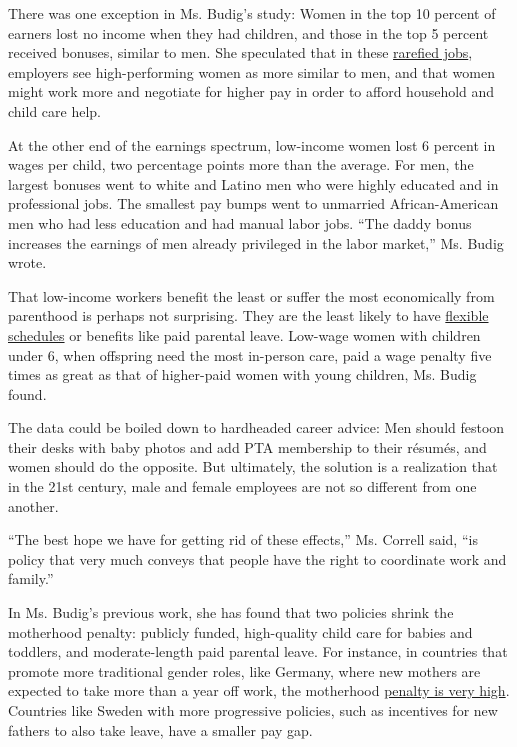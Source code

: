 There was one exception in Ms. Budig's study: Women in the top 10
percent of earners lost no income when they had children, and those in
the top 5 percent received bonuses, similar to men. She speculated that
in these
\href{http://www.nytimes3xbfgragh.onion/2014/06/08/business/riches-come-to-women-as-ceos-but-few-get-there.html}{rarefied
jobs}, employers see high-performing women as more similar to men, and
that women might work more and negotiate for higher pay in order to
afford household and child care help.

At the other end of the earnings spectrum, low-income women lost 6
percent in wages per child, two percentage points more than the average.
For men, the largest bonuses went to white and Latino men who were
highly educated and in professional jobs. The smallest pay bumps went to
unmarried African-American men who had less education and had manual
labor jobs. ``The daddy bonus increases the earnings of men already
privileged in the labor market,'' Ms. Budig wrote.

That low-income workers benefit the least or suffer the most
economically from parenthood is perhaps not surprising. They are the
least likely to have
\href{http://www.nytimes3xbfgragh.onion/interactive/2014/08/13/us/starbucks-workers-scheduling-hours.html}{flexible
schedules} or benefits like paid parental leave. Low-wage women with
children under 6, when offspring need the most in-person care, paid a
wage penalty five times as great as that of higher-paid women with young
children, Ms. Budig found.

The data could be boiled down to hardheaded career advice: Men should
festoon their desks with baby photos and add PTA membership to their
résumés, and women should do the opposite. But ultimately, the solution
is a realization that in the 21st century, male and female employees are
not so different from one another.

``The best hope we have for getting rid of these effects,'' Ms. Correll
said, ``is policy that very much conveys that people have the right to
coordinate work and family.''

In Ms. Budig's previous work, she has found that two policies shrink the
motherhood penalty: publicly funded, high-quality child care for babies
and toddlers, and moderate-length paid parental leave. For instance, in
countries that promote more traditional gender roles, like Germany,
where new mothers are expected to take more than a year off work, the
motherhood
\href{http://www.nytimes3xbfgragh.onion/2014/08/10/upshot/can-family-leave-policies-be-too-generous-it-seems-so.html}{penalty
is very high}. Countries like Sweden with more progressive policies,
such as incentives for new fathers to also take leave, have a smaller
pay gap.

